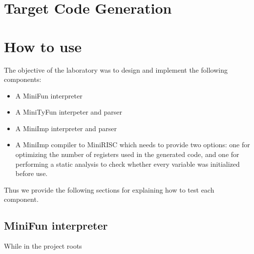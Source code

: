 \documentclass[a4paper,11pt]{report}
\begin{document}
\section{Target Code Generation}

\section{How to use}

The objective of the laboratory was to design and implement the following components:

\begin{itemize}
	\item A MiniFun interpreter 
	\item A MiniTyFun interpeter and parser
	\item A MiniImp interpreter and parser
	\item A MiniImp compiler to MiniRISC which needs to provide two options: one for optimizing the number of registers used in the generated code, and one for performing a static analysis to check whether every variable was initialized before use. 
\end{itemize}

Thus we provide the following sections for explaining how to test each component.

\subsection{MiniFun interpreter}

While in the project roots
\end{document}

